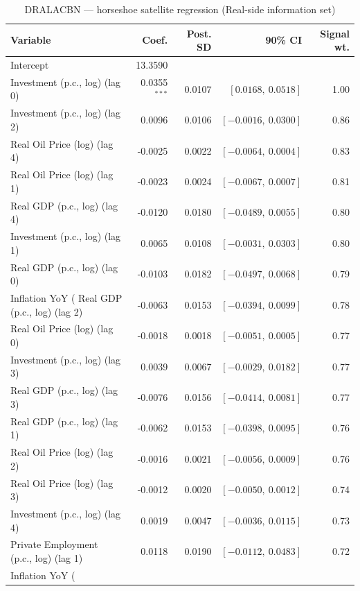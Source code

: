 \begin{table}[!htbp]
\centering
\caption{DRALACBN --- horseshoe satellite regression (Real-side information set)}
\label{tab:dralacbn_real_side_horseshoe}
\begin{tabular}{lrrrr}
\toprule
Variable & Coef. & Post. SD & 90\% CI & Signal wt. \\
\midrule
Intercept & 13.3590 & & & \\
Investment (p.c., log) (lag 0) & 0.0355$^{***}$ & 0.0107 & $[0.0168,\ 0.0518]$ & 1.00 \\
Investment (p.c., log) (lag 2) & 0.0096 & 0.0106 & $[-0.0016,\ 0.0300]$ & 0.86 \\
Real Oil Price (log) (lag 4) & -0.0025 & 0.0022 & $[-0.0064,\ 0.0004]$ & 0.83 \\
Real Oil Price (log) (lag 1) & -0.0023 & 0.0024 & $[-0.0067,\ 0.0007]$ & 0.81 \\
Real GDP (p.c., log) (lag 4) & -0.0120 & 0.0180 & $[-0.0489,\ 0.0055]$ & 0.80 \\
Investment (p.c., log) (lag 1) & 0.0065 & 0.0108 & $[-0.0031,\ 0.0303]$ & 0.80 \\
Real GDP (p.c., log) (lag 0) & -0.0103 & 0.0182 & $[-0.0497,\ 0.0068]$ & 0.79 \\
Inflation YoY (%
Real GDP (p.c., log) (lag 2) & -0.0063 & 0.0153 & $[-0.0394,\ 0.0099]$ & 0.78 \\
Real Oil Price (log) (lag 0) & -0.0018 & 0.0018 & $[-0.0051,\ 0.0005]$ & 0.77 \\
Investment (p.c., log) (lag 3) & 0.0039 & 0.0067 & $[-0.0029,\ 0.0182]$ & 0.77 \\
Real GDP (p.c., log) (lag 3) & -0.0076 & 0.0156 & $[-0.0414,\ 0.0081]$ & 0.77 \\
Real GDP (p.c., log) (lag 1) & -0.0062 & 0.0153 & $[-0.0398,\ 0.0095]$ & 0.76 \\
Real Oil Price (log) (lag 2) & -0.0016 & 0.0021 & $[-0.0056,\ 0.0009]$ & 0.76 \\
Real Oil Price (log) (lag 3) & -0.0012 & 0.0020 & $[-0.0050,\ 0.0012]$ & 0.74 \\
Investment (p.c., log) (lag 4) & 0.0019 & 0.0047 & $[-0.0036,\ 0.0115]$ & 0.73 \\
Private Employment (p.c., log) (lag 1) & 0.0118 & 0.0190 & $[-0.0112,\ 0.0483]$ & 0.72 \\
Inflation YoY (%

\end{tabular}
\end{table}

